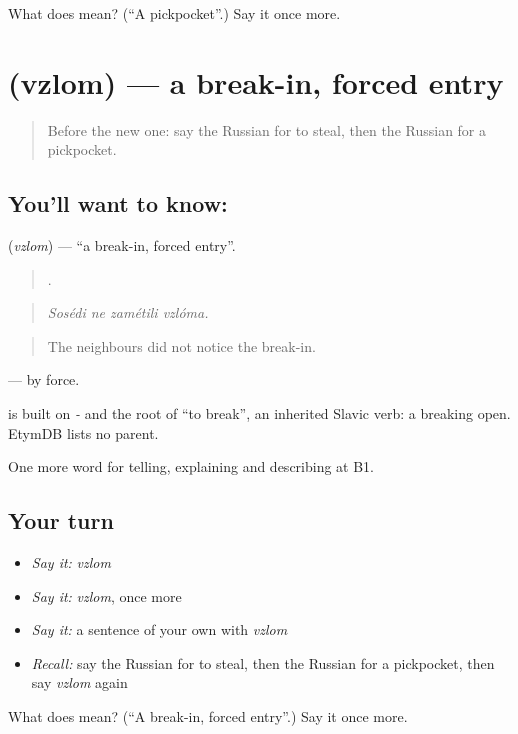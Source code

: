 \begin{tcolorbox}[breakable,colback=teal!4,colframe=teal!35!black,title={Before you move on}]
What does  mean? (\textquotedblleft{}A pickpocket\textquotedblright{}.) Say it once more.
\end{tcolorbox}
\section[\texorpdfstring{\ru{взлом} (vzlom)}{взлом (vzlom)}]{ (vzlom) — a break-in, forced entry}

\label{lesson:RU-C288-vzlom}



\begin{quote}
Before the new one: say the Russian for to steal, then the Russian for a pickpocket.
\end{quote}

\subsection*{You'll want to know: }
\textbf{} (\emph{vzlom}) — \textquotedblleft{}a break-in, forced entry\textquotedblright{}.

\begin{quote}
   .
\end{quote}

\begin{quote}
\emph{Sosédi ne zamétili vzlóma.}
\end{quote}

\begin{quote}
The neighbours did not notice the break-in.
\end{quote}

\emph{ } — by force.

\begin{cousinweb}
\emph{} is built on \emph{-} and the root of \emph{} \textquotedblleft{}to break\textquotedblright{}, an inherited Slavic verb: a breaking open. EtymDB lists no parent.
\end{cousinweb}

\begin{grammarlens}[title={What you've built}]
One more word for telling, explaining and describing at B1.
\end{grammarlens}

\subsection*{Your turn}
\begin{itemize}
\raggedright
  \item \emph{Say it:} \emph{vzlom}
  \item \emph{Say it:} \emph{vzlom}, once more
  \item \emph{Say it:} a sentence of your own with \emph{vzlom}
  \item \emph{Recall:} say the Russian for to steal, then the Russian for a pickpocket, then say \emph{vzlom} again
\end{itemize}

\begin{tcolorbox}[breakable,colback=teal!4,colframe=teal!35!black,title={Before you move on}]
What does  mean? (\textquotedblleft{}A break-in, forced entry\textquotedblright{}.) Say it once more.
\end{tcolorbox}
